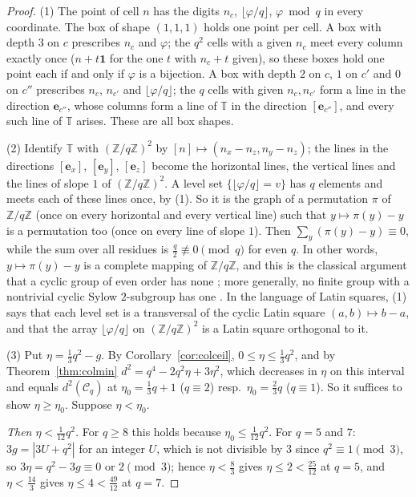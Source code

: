 \documentclass[11pt]{amsart}
\theoremstyle{definition}
\theoremstyle{plain}
\newcommand{\Z}{\mathbb{Z}}
\newcommand{\e}{\mathbf{e}}
\begin{document}
\begin{proof}
(1) The point of cell $n$ has the digits $n_c$, $\lfloor\varphi/q\rfloor$, $\varphi\bmod q$ in every coordinate. The box of shape $(1,1,1)$ holds one point per cell. A box with depth $3$ on $c$ prescribes $n_c$ and $\varphi$; the $q^2$ cells with a given $n_c$ meet every column exactly once ($n+t\mathbf 1$ for the one $t$ with $n_c+t$ given), so these boxes hold one point each if and only if $\varphi$ is a bijection. A box with depth $2$ on $c$, $1$ on $c'$ and $0$ on $c''$ prescribes $n_c$, $n_{c'}$ and $\lfloor\varphi/q\rfloor$; the $q$ cells with given $n_c,n_{c'}$ form a line in the direction $\e_{c''}$, whose columns form a line of $\mathbb T$ in the direction $[\e_{c''}]$, and every such line of $\mathbb T$ arises. These are all box shapes.

(2) Identify $\mathbb T$ with $(\Z/q\Z)^2$ by $[n]\mapsto(n_x-n_z,n_y-n_z)$; the lines in the directions $[\e_x]$, $[\e_y]$, $[\e_z]$ become the horizontal lines, the vertical lines and the lines of slope $1$ of $(\Z/q\Z)^2$. A level set $\{\lfloor\varphi/q\rfloor=v\}$ has $q$ elements and meets each of these lines once, by (1). So it is the graph of a permutation $\pi$ of $\Z/q\Z$ (once on every horizontal and every vertical line) such that $y\mapsto\pi(y)-y$ is a permutation too (once on every line of slope $1$). Then $\sum_y(\pi(y)-y)\equiv0$, while the sum over all residues is $\frac q2\not\equiv0\pmod q$ for even $q$. In other words, $y\mapsto\pi(y)-y$ is a complete mapping of $\Z/q\Z$, and this is the classical argument that a cyclic group of even order has none \cite[Thm.~1 and its corollary]{Pai51}; more generally, no finite group with a nontrivial cyclic Sylow $2$-subgroup has one \cite[Thm.~5]{HP55}. In the language of Latin squares, (1) says that each level set is a transversal of the cyclic Latin square $(a,b)\mapsto b-a$, and that the array $\lfloor\varphi/q\rfloor$ on $(\Z/q\Z)^2$ is a Latin square orthogonal to it.

(3) Put $\eta=\frac13q^2-g$. By Corollary~\ref{cor:colceil}, $0\le\eta\le\frac13q^2$, and by Theorem~\ref{thm:colmin} $d^2=q^4-2q^2\eta+3\eta^2$, which decreases in $\eta$ on this interval and equals $d^2(\mathcal C_q)$ at $\eta_0=\frac13q+1$ ($q\equiv2$) resp.\ $\eta_0=\frac23q$ ($q\equiv1$). So it suffices to show $\eta\ge\eta_0$. Suppose $\eta<\eta_0$.

\emph{Then $\eta<\frac1{12}q^2$.} For $q\ge8$ this holds because $\eta_0\le\frac1{12}q^2$. For $q=5$ and $7$: $3g=|3U+q^2|$ for an integer $U$, which is not divisible by $3$ since $q^2\equiv1\pmod3$, so $3\eta=q^2-3g\equiv0$ or $2\pmod3$; hence $\eta<\frac83$ gives $\eta\le2<\frac{25}{12}$ at $q=5$, and $\eta<\frac{14}3$ gives $\eta\le4<\frac{49}{12}$ at $q=7$.


\end{proof}
\end{document}
